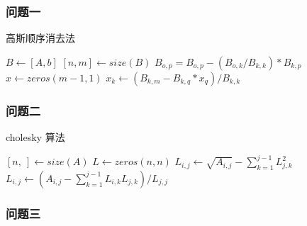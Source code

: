 \subsubsection{问题一}

\begin{breakablealgorithm}
    \caption{高斯顺序消去法}
    \begin{algorithmic}[1]
        \STATE $B \leftarrow [A, b]$ 
        \STATE $[n, m] \leftarrow size(B)$ 
        \STATE $B_{o, p} = B_{o, p} - (B_{o, k} / B_{k, k}) * B_{k, p}$
        \ENDFOR
        \ENDFOR
        \ENDFOR
        \STATE $x \leftarrow zeros(m-1, 1)$ 
        \STATE $x_k \leftarrow (B_{k, m} - B_{k, q} * x_q ) / B_{k, k}$
        \ENDFOR
        \ENDFOR
    \end{algorithmic}
\end{breakablealgorithm}

\subsubsection{问题二}

\begin{breakablealgorithm}
    \caption{cholesky 算法}
    \begin{algorithmic}[1]
        \STATE $[n, ~] \leftarrow size(A)$ 
        \STATE $L \leftarrow zeros(n, n)$ 
        \STATE $L_{i, j} \leftarrow \sqrt{A_{i, j}} - \sum_{k=1}^{j-1}L_{j, k}^2$
        \ELSE
        \STATE $L_{i, j} \leftarrow (A_{i, j} - \sum_{k=1}^{j-1}L_{i, k}L_{j, k}) / L_{j, j}$
        \ENDIF
        \ENDFOR
        \ENDFOR
    \end{algorithmic}
\end{breakablealgorithm}

\subsubsection{问题三}
